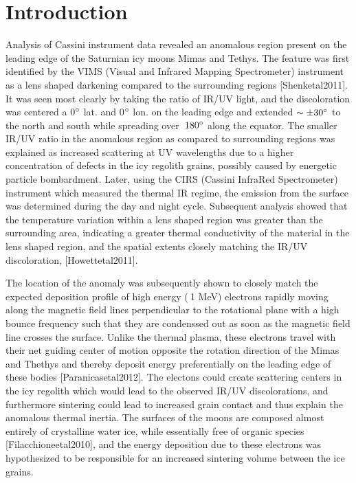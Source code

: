 \documentclass[11pt]{article} %
\begin{document}
\begin{itemize}
\begin{itemize}
	\end{itemize}

\newpage
\section{Introduction}
\label{sec:intro}

	Analysis of Cassini instrument data revealed an anomalous region present on the leading edge of the Saturnian icy moons Mimas and Tethys. The feature was first identified by the VIMS (Visual and Infrared Mapping Spectrometer) instrument as a lens shaped darkening compared to the surrounding regions [Shenketal2011]. It was seen most clearly by taking the ratio of IR/UV light, and the discoloration was centered a 0$\degree$ lat. and 0$\degree$ lon. on the leading edge and extended $\sim \pm30\degree$ to the north and south while spreading over $\>180 \degree$ along the equator. The smaller IR/UV ratio in the anomalous region as compared to surrounding regions was explained as increased scattering at UV wavelengths due to a higher concentration of defects in the icy regolith grains, possibly caused by energetic particle bombardment. Later, using the CIRS (Cassini InfraRed Spectrometer) instrument which measured the thermal IR regime, the emission from the surface was determined during the day and night cycle. Subsequent analysis showed that the temperature variation within a lens shaped region was greater than the surrounding area, indicating a greater thermal conductivity of the material in the lens shaped region, and the spatial extents closely matching the IR/UV discoloration,  [Howettetal2011]. 

	The location of the anomaly was subsequently shown to closely match the expected deposition profile of high energy ($\>$1 MeV) electrons rapidly moving along the magnetic field lines perpendicular to the rotational plane with a high bounce frequency such that they are condenssed out as soon as the magnetic field line crosses the surface. Unlike the thermal plasma, these electrons travel with their net guiding center of motion opposite the rotation direction of the Mimas and Thethys and thereby deposit energy preferentially on the leading edge of these bodies [Paranicasetal2012]. The electons could create scattering centers in the icy regolith which would lead to the observed IR/UV discolorations, and furthermore sintering could lead to increased grain contact and thus explain the anomalous thermal inertia.  The surfaces of the moons are composed almost entirely of crystalline water ice, while essentially free of organic species [Filacchioneetal2010], and the energy deposition due to these electrons was hypothesized to be responsible for an increased sintering volume between the ice grains.


\end{itemize}
\end{document}
